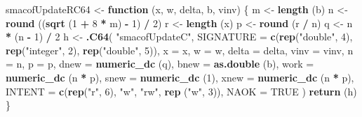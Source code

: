 \documentclass[12pt,]{article}
\newenvironment{Shaded}{\begin{snugshade}}{\end{snugshade}}
\newcommand{\KeywordTok}[1]{\textcolor[rgb]{0.13,0.29,0.53}{\textbf{#1}}}
\newcommand{\DataTypeTok}[1]{\textcolor[rgb]{0.13,0.29,0.53}{#1}}
\newcommand{\DecValTok}[1]{\textcolor[rgb]{0.00,0.00,0.81}{#1}}
\newcommand{\StringTok}[1]{\textcolor[rgb]{0.31,0.60,0.02}{#1}}
\newcommand{\OtherTok}[1]{\textcolor[rgb]{0.56,0.35,0.01}{#1}}
\newcommand{\ControlFlowTok}[1]{\textcolor[rgb]{0.13,0.29,0.53}{\textbf{#1}}}
\newcommand{\OperatorTok}[1]{\textcolor[rgb]{0.81,0.36,0.00}{\textbf{#1}}}
\newcommand{\NormalTok}[1]{#1}
\begin{document}
\begin{Shaded}
\begin{Highlighting}[]
\NormalTok{smacofUpdateRC64 <-}\StringTok{ }\ControlFlowTok{function}\NormalTok{ (x, w, delta, b, vinv) \{}
\NormalTok{  m <-}\StringTok{ }\KeywordTok{length}\NormalTok{ (b)}
\NormalTok{  n <-}\StringTok{ }\KeywordTok{round}\NormalTok{ ((}\KeywordTok{sqrt}\NormalTok{ (}\DecValTok{1} \OperatorTok{+}\StringTok{ }\DecValTok{8} \OperatorTok{*}\StringTok{ }\NormalTok{m) }\OperatorTok{-}\StringTok{ }\DecValTok{1}\NormalTok{) }\OperatorTok{/}\StringTok{ }\DecValTok{2}\NormalTok{)}
\NormalTok{  r <-}\StringTok{ }\KeywordTok{length}\NormalTok{ (x)}
\NormalTok{  p <-}\StringTok{ }\KeywordTok{round}\NormalTok{ (r }\OperatorTok{/}\StringTok{ }\NormalTok{n)}
\NormalTok{  q <-}\StringTok{ }\NormalTok{n }\OperatorTok{*}\StringTok{ }\NormalTok{(n }\OperatorTok{-}\StringTok{ }\DecValTok{1}\NormalTok{) }\OperatorTok{/}\StringTok{ }\DecValTok{2}
\NormalTok{  h <-}
\StringTok{    }\KeywordTok{.C64}\NormalTok{(}
      \StringTok{"smacofUpdateC"}\NormalTok{,}
      \DataTypeTok{SIGNATURE =} \KeywordTok{c}\NormalTok{(}\KeywordTok{rep}\NormalTok{(}\StringTok{"double"}\NormalTok{, }\DecValTok{4}\NormalTok{), }\KeywordTok{rep}\NormalTok{(}\StringTok{"integer"}\NormalTok{, }\DecValTok{2}\NormalTok{), }\KeywordTok{rep}\NormalTok{(}\StringTok{"double"}\NormalTok{, }\DecValTok{5}\NormalTok{)),}
      \DataTypeTok{x =}\NormalTok{ x,}
      \DataTypeTok{w =}\NormalTok{ w,}
      \DataTypeTok{delta =}\NormalTok{ delta,}
      \DataTypeTok{vinv =}\NormalTok{ vinv,}
      \DataTypeTok{n =}\NormalTok{ n,}
      \DataTypeTok{p =}\NormalTok{ p,}
      \DataTypeTok{dnew =} \KeywordTok{numeric_dc}\NormalTok{ (q),}
      \DataTypeTok{bnew =} \KeywordTok{as.double}\NormalTok{ (b),}
      \DataTypeTok{work =} \KeywordTok{numeric_dc}\NormalTok{ (n }\OperatorTok{*}\StringTok{ }\NormalTok{p),}
      \DataTypeTok{snew =} \KeywordTok{numeric_dc}\NormalTok{ (}\DecValTok{1}\NormalTok{),}
      \DataTypeTok{xnew =} \KeywordTok{numeric_dc}\NormalTok{ (n }\OperatorTok{*}\StringTok{ }\NormalTok{p),}
      \DataTypeTok{INTENT =} \KeywordTok{c}\NormalTok{(}\KeywordTok{rep}\NormalTok{(}\StringTok{"r"}\NormalTok{, }\DecValTok{6}\NormalTok{), }\StringTok{"w"}\NormalTok{, }\StringTok{"rw"}\NormalTok{, }\KeywordTok{rep}\NormalTok{ (}\StringTok{"w"}\NormalTok{, }\DecValTok{3}\NormalTok{)),}
      \DataTypeTok{NAOK =} \OtherTok{TRUE}
\NormalTok{    )}
  \KeywordTok{return}\NormalTok{ (h)}
\NormalTok{\}}


\end{Highlighting}
\end{Shaded}
\end{document}
